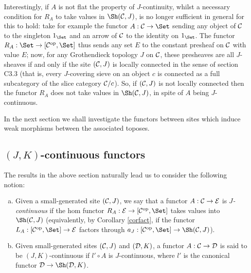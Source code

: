 \documentclass[a4paper,12pt]{article}
\begin{document}
\begin{remark}\label{remflatnessandcanonicity}
	Interestingly, if $A$ is not flat the property of $J$-continuity, whilst a necessary condition for $R_{A}$ to take values in $\Sh({\cal C}, J)$, is no longer sufficient in general for this to hold: take for example the functor $A:{\cal C}\to \Set$ sending any object of $\cal C$ to the singleton $1_{\Set}$ and an arrow of $\cal C$ to the identity on $1_{\Set}$. The functor $R_{A}:\Set \to [{\cal C}^{\textup{op}}, \Set]$ thus sends any set $E$ to the constant presheaf on $\cal C$ with value $E$; now, for any Grothendieck topology $J$ on $\cal C$, these presheaves are all $J$-sheaves if and only if the site $({\cal C}, J)$ is locally connected in the sense of section C3.3 \cite{El} (that is, every $J$-covering sieve on an object $c$ is connected as a full subcategory of the slice category ${\cal C}\slash c$). So, if $({\cal C}, J)$ is not locally connected then the functor $R_{A}$ does not take values in $\Sh({\cal C}, J)$, in spite of $A$ being $J$-continuous.
\end{remark}

In the next section we shall investigate the functors between sites which induce weak morphisms between the associated toposes. 

\subsection{$(J, K)$-continuous functors}\label{subsec:continuousfunctors}

The results in the above section naturally lead us to consider the following notion: 

\begin{definition}\label{defcanonicalfunctor}
	\begin{enumerate}[(a)]
		\item Given a small-generated site $({\cal C}, J)$, we say that a functor $A:{\cal C}\to {\cal E}$ is \emph{$J$-continuous} if the hom functor $R_{A}:{\cal E}\to [{\cal C}^{\textup{op}}, \Set]$ takes values into $\Sh({\cal C}, J)$ (equivalently, by Corollary \ref{corfact}, if the functor $L_{A}: [{\cal C}^{\textup{op}}, \Set]\to {\cal E}$ factors through $a_{J}:[{\cal C}^{\textup{op}}, \Set] \to \Sh({\cal C}, J)$). 
		
		\item Given small-generated sites $({\cal C}, J)$ and $({\cal D}, K)$, a functor $A:{\cal C}\to {\cal D}$ is said to be $(J, K)$-continuous if $l'\circ A$ is $J$-continuous, where $l'$ is the canonical functor ${\cal D}\to \Sh({\cal D}, K)$.
	\end{enumerate}	
\end{definition}
\end{document}
